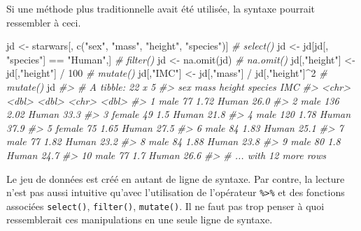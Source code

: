 \documentclass[
]{book}
\newenvironment{Shaded}{}{}
\newcommand{\CommentTok}[1]{\textit{#1}}
\newcommand{\DecValTok}[1]{#1}
\newcommand{\FunctionTok}[1]{#1}
\newcommand{\NormalTok}[1]{#1}
\newcommand{\OtherTok}[1]{#1}
\newcommand{\SpecialCharTok}[1]{#1}
\newcommand{\StringTok}[1]{#1}
\begin{document}
Si une méthode plus traditionnelle avait été utilisée, la syntaxe pourrait ressembler à ceci.

\begin{Shaded}
\begin{Highlighting}[]
\NormalTok{jd }\OtherTok{\textless{}{-}}\NormalTok{ starwars[, }\FunctionTok{c}\NormalTok{(}\StringTok{"sex"}\NormalTok{, }\StringTok{"mass"}\NormalTok{, }\StringTok{"height"}\NormalTok{, }\StringTok{"species"}\NormalTok{)]  }\CommentTok{\# select()}
\NormalTok{jd }\OtherTok{\textless{}{-}}\NormalTok{ jd[jd[, }\StringTok{"species"}\NormalTok{] }\SpecialCharTok{==} \StringTok{"Human"}\NormalTok{,]                    }\CommentTok{\# filter()}
\NormalTok{jd }\OtherTok{\textless{}{-}} \FunctionTok{na.omit}\NormalTok{(jd)                                        }\CommentTok{\# na.omit()}
\NormalTok{jd[,}\StringTok{"height"}\NormalTok{] }\OtherTok{\textless{}{-}}\NormalTok{ jd[,}\StringTok{"height"}\NormalTok{] }\SpecialCharTok{/} \DecValTok{100}                     \CommentTok{\# mutate()}
\NormalTok{jd[,}\StringTok{"IMC"}\NormalTok{] }\OtherTok{\textless{}{-}}\NormalTok{ jd[,}\StringTok{"mass"}\NormalTok{] }\SpecialCharTok{/}\NormalTok{ jd[,}\StringTok{"height"}\NormalTok{]}\SpecialCharTok{\^{}}\DecValTok{2}              \CommentTok{\# mutate()}
\NormalTok{jd}
\CommentTok{\#\textgreater{} \# A tibble: 22 x 5}
\CommentTok{\#\textgreater{}    sex     mass height species   IMC}
\CommentTok{\#\textgreater{}    \textless{}chr\textgreater{}  \textless{}dbl\textgreater{}  \textless{}dbl\textgreater{} \textless{}chr\textgreater{}   \textless{}dbl\textgreater{}}
\CommentTok{\#\textgreater{}  1 male      77   1.72 Human    26.0}
\CommentTok{\#\textgreater{}  2 male     136   2.02 Human    33.3}
\CommentTok{\#\textgreater{}  3 female    49   1.5  Human    21.8}
\CommentTok{\#\textgreater{}  4 male     120   1.78 Human    37.9}
\CommentTok{\#\textgreater{}  5 female    75   1.65 Human    27.5}
\CommentTok{\#\textgreater{}  6 male      84   1.83 Human    25.1}
\CommentTok{\#\textgreater{}  7 male      77   1.82 Human    23.2}
\CommentTok{\#\textgreater{}  8 male      84   1.88 Human    23.8}
\CommentTok{\#\textgreater{}  9 male      80   1.8  Human    24.7}
\CommentTok{\#\textgreater{} 10 male      77   1.7  Human    26.6}
\CommentTok{\#\textgreater{} \# ... with 12 more rows}
\end{Highlighting}
\end{Shaded}

Le jeu de données est créé en autant de ligne de syntaxe. Par contre, la lecture n'est pas aussi intuitive qu'avec l'utilisation de l'opérateur \texttt{\%\textgreater{}\%} et des fonctions associées \texttt{select()}, \texttt{filter()}, \texttt{mutate()}. Il ne faut pas trop penser à quoi ressemblerait ces manipulations en une seule ligne de syntaxe.
\end{document}
